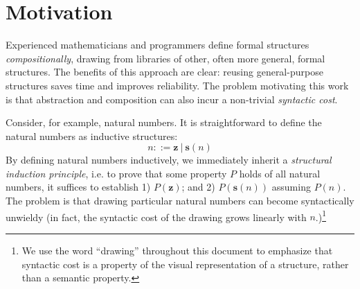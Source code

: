 \section{Motivation}\label{sec:intro-motivation}

Experienced mathematicians and programmers define formal structures \emph{compositionally}, drawing from libraries of other, often more general, formal structures. The benefits of this approach are clear: reusing general-purpose structures saves time and improves reliability.  The problem motivating this work is that abstraction and composition can also incur a non-trivial \emph{syntactic cost}. %

Consider, for example, natural numbers. It is straightforward to define the natural numbers as inductive structures:
\[ n ::= \textbf{z} ~\vert~ \textbf{s}(n)\]
By defining natural numbers inductively, we immediately inherit a \emph{structural induction principle}, i.e. to prove that some property $P$ holds of all natural numbers, it suffices to establish 1) $P(\textbf{z})$; and 2) $P(\textbf{s}(n))$ assuming $P(n)$. The problem is that drawing particular natural numbers can become syntactically unwieldy (in fact, the syntactic cost of the drawing grows linearly with $n$.)\footnote{We use the word ``drawing'' throughout this document to emphasize that syntactic cost is a property of the visual representation of a structure, rather than a semantic property.}


